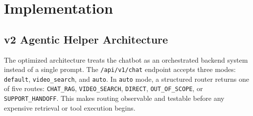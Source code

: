 \section{Implementation}

\subsection{v2 Agentic Helper Architecture}

The optimized architecture treats the chatbot as an orchestrated backend system instead of a
single prompt. The \texttt{/api/v1/chat} endpoint accepts three modes:
\texttt{default}, \texttt{video\_search}, and \texttt{auto}. In \texttt{auto} mode, a structured
router returns one of five routes: \texttt{CHAT\_RAG}, \texttt{VIDEO\_SEARCH},
\texttt{DIRECT}, \texttt{OUT\_OF\_SCOPE}, or \texttt{SUPPORT\_HANDOFF}. This makes routing
observable and testable before any expensive retrieval or tool execution begins.

